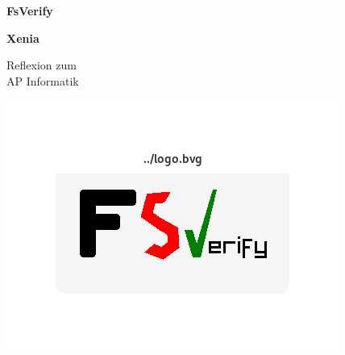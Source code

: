 \begin{center}
	{
		\vspace*{1cm}
		
		\Huge
		\textbf{FsVerify}
		
		\vspace{2cm}
		
		\textbf{Xenia}
		
		\vspace{1.5cm}
		
		Reflexion zum\\
		AP Informatik

                \vspace{3cm}
                
                \includegraphics{logo.png}
                
		\vfill
	}
\end{center}


